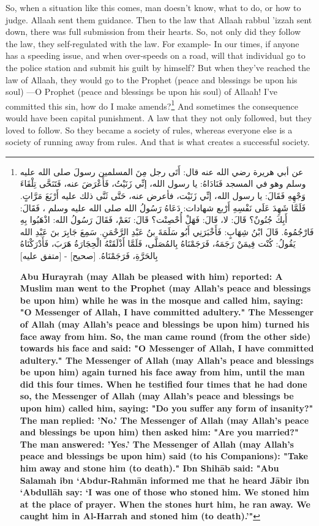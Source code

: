 {So, when a situation like this comes, man doesn't know, what to do, or how to judge. Allaah sent them guidance. Then to the law that Allaah rabbul 'izzah sent down, there was full submission from their hearts. So, not only did they follow the law, they self-regulated with the law. For example- In our times, if anyone has a speeding issue, and when over-speeds on a road, will that individual go to the police station and submit his guilt by himself? But when they've reached the law of Allaah, they would go to the Prophet (peace and blessings be upon his soul) ---O Prophet (peace and blessings be upon his soul) of Allaah! I've committed this sin, how do I make amends?\footnote{
    \begin{RLtext}
        عن أبي هريرة رضي الله عنه قال: أَتَى رجل مِنَ المسلمين رسولَ صلى الله عليه وسلم وهو في المسجد فَنَادَاهُ: يا رسول الله، إنِّي زَنَيْتُ، فَأَعْرَضَ عنه، فَتَنَحَّى تِلْقَاءَ وَجْهِهِ فَقَالَ: يا رسول الله، إنِّي زَنَيْت، فأعرض عنه، حَتَّى ثَنَّى ذلك عليه أَرْبَعَ مَرَّاتٍ. فَلَمَّا شَهِدَ عَلَى نَفْسِهِ أَرْبع شهادات: دَعَاهُ رَسُولُ الله صلى الله عليه وسلم ، فَقَالَ: أَبِكَ جُنُونٌ؟ قَالَ: لا، قَالَ: فَهَلْ أُحْصِنْت؟ قَالَ: نَعَمْ، فَقَالَ رَسُولُ الله: اذْهَبُوا بِهِ فَارْجُمُوهُ. قَالَ ابْنُ شِهَابٍ: فَأَخْبَرَنِي أَبُو سَلَمَةَ بنُ عَبْدِ الرَّحْمَنِ. سَمِعَ جَابِرَ بنَ عَبْدِ الله يَقُولُ: كُنْت فِيمَنْ رَجَمَهُ، فَرَجَمْنَاهُ بِالمُصَلَّى، فَلَمَّا أَذْلَقَتْهُ الْحِجَارَةُ هَرَبَ، فَأَدْرَكْنَاهُ بِالحَرَّةِ، فَرَجَمْنَاهُ.  
[صحيح] - [متفق عليه]
    \end{RLtext}
    \textbf{Abu Hurayrah (may Allah be pleased with him) reported: A Muslim man went to the Prophet (may Allah's peace and blessings be upon him) while he was in the mosque and called him, saying: "O Messenger of Allah, I have committed adultery." The Messenger of Allah (may Allah's peace and blessings be upon him) turned his face away from him. So, the man came round (from the other side) towards his face and said: "O Messenger of Allah, I have committed adultery." The Messenger of Allah (may Allah's peace and blessings be upon him) again turned his face away from him, until the man did this four times. When he testified four times that he had done so, the Messenger of Allah (may Allah's peace and blessings be upon him) called him, saying: "Do you suffer any form of insanity?" The man replied: 'No.' The Messenger of Allah (may Allah's peace and blessings be upon him) then asked him: "Are you married?" The man answered: 'Yes.' The Messenger of Allah (may Allah's peace and blessings be upon him) said (to his Companions): "Take him away and stone him (to death)." Ibn Shihāb said: "Abu Salamah ibn ‘Abdur-Rahmān informed me that he heard Jābir ibn ‘Abdullāh say: ‘I was one of those who stoned him. We stoned him at the place of prayer. When the stones hurt him, he ran away. We caught him in Al-Harrah and stoned him (to death).'"}
} And sometimes the consequence would have been capital punishment. A law that they not only followed, but they loved to follow. So they became a society of rules, whereas everyone else is a society of running away from rules. And that is what creates a successful society.


}
